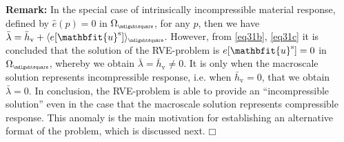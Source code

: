 \documentclass[12pt,a4paper]{article}
\renewcommand{\ta}[1]{\mathbfit{#1}}
\renewcommand{\Box}{\mdlgwhtsquare}
\DeclarePairedDelimiter{\homgen}{\langle}{\rangle_\rve}
\renewcommand{\vol}{\mathrm{v}}
\newcommand{\rve}{
  {\mathchoice
   {\mbox{\scalebox{0.67}{$\Box$}}}
   {\mbox{\scalebox{0.67}{$\Box$}}}
   {\mbox{\scalebox{0.5}{$\Box$}}}
   {\mbox{\scalebox{0.375}{$\Box$}}}
  }
}
\begin{document}
\textbf{Remark:} In the special case of intrinsically incompressible material response, defined by $\hat{e}(p)=0$ in $\Omega_\rve$, for any $p$, then we have  $\bar{\lambda}=\bar{h}_\vol+\homgen{e[\ta{u}^\fluct]}$.
However, from \cref{eq31b}, \cref{eq31c} it is concluded that the solution of the RVE-problem is $e[\ta{u}^\fluct]=0$ in $\Omega_\rve$, whereby we obtain $\bar{\lambda}=\bar{h}_\vol \neq 0$.
It is only when the macroscale solution represents incompressible response, i.e. when $\bar{h}_\vol = 0$, that we obtain $\bar{\lambda} = 0$.
In conclusion, the RVE-problem is able to provide an ``incompressible solution'' even in the case that the macroscale solution represents compressible response.
This anomaly is the main motivation for establishing an alternative format of the problem, which is discussed next. $\Box$
\end{document}
